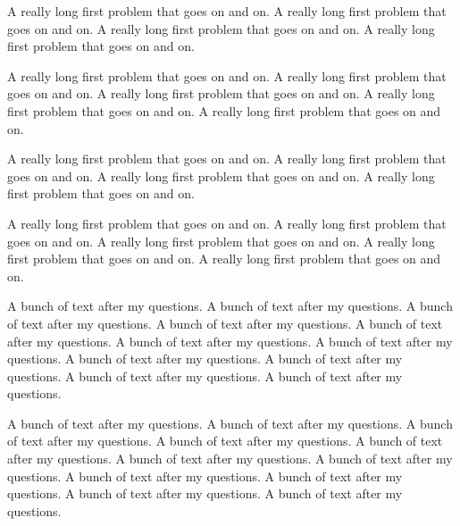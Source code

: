 \documentclass{ximera}
\begin{document}
\begin{questions}
	\item A really long first problem that goes on and on.  A really long first problem that goes on and on.  A really long first problem that goes on and on.  A really long first problem that goes on and on.  
	
	A really long first problem that goes on and on.  A really long first problem that goes on and on.  A really long first problem that goes on and on.  A really long first problem that goes on and on.  A really long first problem that goes on and on.  
	
	
	\item A really long first problem that goes on and on.  A really long first problem that goes on and on.  A really long first problem that goes on and on.  A really long first problem that goes on and on.  
	
	A really long first problem that goes on and on.  A really long first problem that goes on and on.  A really long first problem that goes on and on.  A really long first problem that goes on and on.  A really long first problem that goes on and on.  
	
\end{questions}

A bunch of text after my questions.  A bunch of text after my questions.  A bunch of text after my questions.  A bunch of text after my questions.  A bunch of text after my questions.  A bunch of text after my questions.  A bunch of text after my questions.  A bunch of text after my questions.  A bunch of text after my questions.  A bunch of text after my questions.  A bunch of text after my questions.  

A bunch of text after my questions.  A bunch of text after my questions.  A bunch of text after my questions.  A bunch of text after my questions.  A bunch of text after my questions.  A bunch of text after my questions.  A bunch of text after my questions.  A bunch of text after my questions.  A bunch of text after my questions.  A bunch of text after my questions.  A bunch of text after my questions.  
\end{document}
